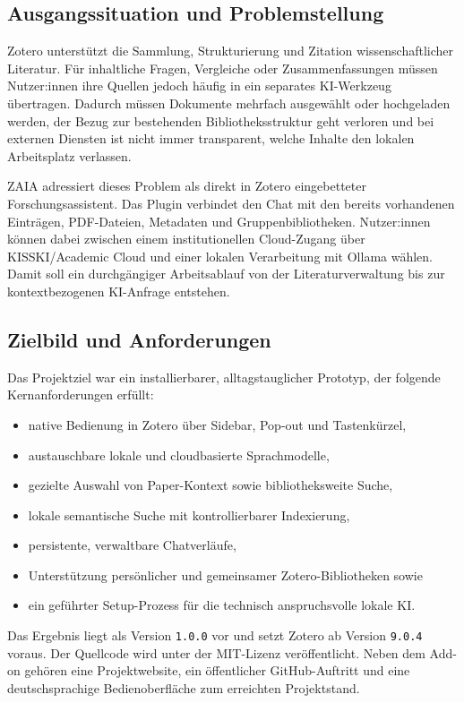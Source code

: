 \documentclass[11pt,a4paper,oneside,parskip=half]{scrartcl}
\begin{document}
\subsection{Ausgangssituation und Problemstellung}

Zotero unterstützt die Sammlung, Strukturierung und Zitation wissenschaftlicher
Literatur. Für inhaltliche Fragen, Vergleiche oder Zusammenfassungen müssen
Nutzer:innen ihre Quellen jedoch häufig in ein separates KI-Werkzeug übertragen.
Dadurch müssen Dokumente mehrfach ausgewählt oder
hochgeladen werden, der Bezug zur bestehenden Bibliotheksstruktur geht verloren und bei
externen Diensten ist nicht immer transparent, welche Inhalte den lokalen
Arbeitsplatz verlassen.

ZAIA adressiert dieses Problem als direkt in Zotero eingebetteter
Forschungsassistent. Das Plugin verbindet den Chat mit den bereits vorhandenen
Einträgen, PDF-Dateien, Metadaten und Gruppenbibliotheken. Nutzer:innen können
dabei zwischen einem institutionellen Cloud-Zugang über KISSKI/Academic Cloud
und einer lokalen Verarbeitung mit Ollama wählen. Damit soll ein durchgängiger
Arbeitsablauf von der Literaturverwaltung bis zur kontextbezogenen KI-Anfrage
entstehen.

\subsection{Zielbild und Anforderungen}

Das Projektziel war ein installierbarer, alltagstauglicher Prototyp, der folgende
Kernanforderungen erfüllt:
\begin{itemize}
  \item native Bedienung in Zotero über Sidebar, Pop-out und Tastenkürzel,
  \item austauschbare lokale und cloudbasierte Sprachmodelle,
  \item gezielte Auswahl von Paper-Kontext sowie bibliotheksweite Suche,
  \item lokale semantische Suche mit kontrollierbarer Indexierung,
  \item persistente, verwaltbare Chatverläufe,
  \item Unterstützung persönlicher und gemeinsamer Zotero-Bibliotheken sowie
  \item ein geführter Setup-Prozess für die technisch anspruchsvolle lokale KI.
\end{itemize}

Das Ergebnis liegt als Version \texttt{1.0.0} vor und setzt Zotero ab Version
\texttt{9.0.4} voraus. Der Quellcode wird unter der MIT-Lizenz veröffentlicht. Neben
dem Add-on gehören eine Projektwebsite, ein öffentlicher GitHub-Auftritt und eine
deutschsprachige Bedienoberfläche zum erreichten Projektstand.
\end{document}
